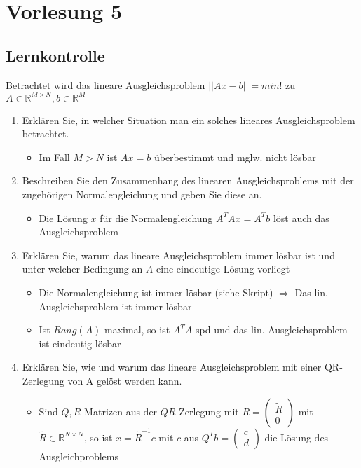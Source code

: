 \documentclass[]{article}
\begin{document}
\section{Vorlesung 5}
\subsection{Lernkontrolle}
	Betrachtet wird das lineare Ausgleichsproblem $||Ax-b|| = min!$ zu $A \in \mathbb{R}^{M \times N}, b \in \mathbb{R}^M$
	\begin{enumerate}
		\item Erklären Sie, in welcher Situation man ein solches lineares Ausgleichsproblem betrachtet.
			\begin{itemize}
				\item Im Fall $M > N$ ist $Ax=b$ überbestimmt und mglw. nicht lösbar
			\end{itemize}
		\item Beschreiben Sie den Zusammenhang des linearen Ausgleichsproblems mit der zugehörigen Normalengleichung und geben Sie diese an.
			\begin{itemize}
				\item Die Lösung $x$ für die Normalengleichung $A^TAx = A^Tb$ löst auch das Ausgleichsproblem
			\end{itemize}
		\item Erklären Sie, warum das lineare Ausgleichsproblem immer lösbar ist und unter welcher Bedingung an $A$ eine eindeutige Lösung vorliegt
			\begin{itemize}
				\item Die Normalengleichung ist immer lösbar (siehe Skript) $\Rightarrow$ Das lin. Ausgleichsproblem ist immer lösbar
				\item Ist $Rang(A)$ maximal, so ist $A^TA$ spd und das lin. Ausgleichsproblem ist eindeutig lösbar
			\end{itemize}
		\item Erklären Sie, wie und warum das lineare Ausgleichsproblem mit einer QR-Zerlegung von A gelöst werden kann.
			\begin{itemize}
				\item Sind $Q, R$ Matrizen aus der $QR$-Zerlegung mit $R = \left (\begin{array}{r} \tilde{R} \\ 0 \end{array} \right)$ mit $\tilde{R} \in \mathbb{R}^{N \times N}$, so ist $x = \tilde{R}^{-1} c$ mit $c$ aus $Q^Tb = \left (\begin{array}{r} c \\ d \end{array} \right)$ die Lösung des Ausgleichproblems

\end{itemize}
\end{enumerate}
\end{document}
